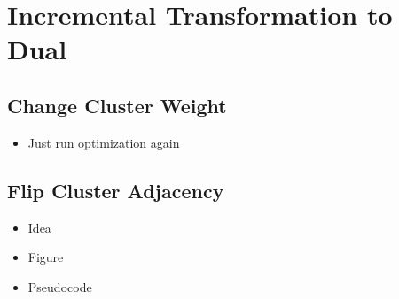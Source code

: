 \section{Incremental Transformation to Dual}
\label{sect:implementation-incremental-transformation}

\subsection{Change Cluster Weight}

\begin{itemize}
	\item Just run optimization again
\end{itemize}

\subsection{Flip Cluster Adjacency}

\begin{itemize}
	\item Idea
	\item Figure
	\item Pseudocode
\end{itemize}
